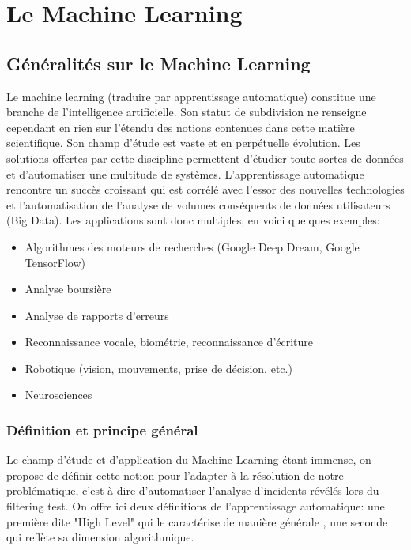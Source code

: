 \chapter{ Le  Machine Learning}
\label{Le Machine Learning}
\thispagestyle{fancy}

\section{Généralités sur le Machine Learning}
\label{Le Machine Learning: Généralités sur le Machine Learning}
Le machine learning (traduire par apprentissage automatique) constitue une branche de l'intelligence artificielle. Son statut de subdivision ne renseigne cependant en rien sur l'étendu des notions contenues dans cette matière scientifique. Son champ d'étude est vaste et en perpétuelle évolution. Les solutions offertes par cette discipline permettent d'étudier toute sortes de données et d'automatiser une multitude de systèmes. L'apprentissage automatique rencontre un succès croissant qui est corrélé avec l'essor des nouvelles technologies et l'automatisation de l'analyse de volumes conséquents de données utilisateurs (Big Data). Les applications sont donc multiples, en voici quelques exemples:  

\begin{itemize}
	\item Algorithmes des moteurs de recherches (Google Deep Dream, Google TensorFlow)
	\item Analyse boursière
	\item Analyse de rapports d'erreurs
	\item Reconnaissance vocale, biométrie, reconnaissance d'écriture
	\item Robotique (vision, mouvements, prise de décision, etc.)
	\item Neurosciences 
\end{itemize}

\subsection{Définition et principe général}
\label{Le Machine Learning: Généralités sur le Machine Learning: Définition et principe général}
Le champ d'étude et d'application du Machine Learning étant immense, on propose de définir cette notion pour l'adapter à la résolution de notre problématique, c'est-à-dire d'automatiser l'analyse d'incidents révélés lors du filtering test.
On offre ici deux définitions de l'apprentissage automatique: une première dite "High Level" qui le caractérise de manière générale , une seconde qui reflète sa dimension algorithmique. 

